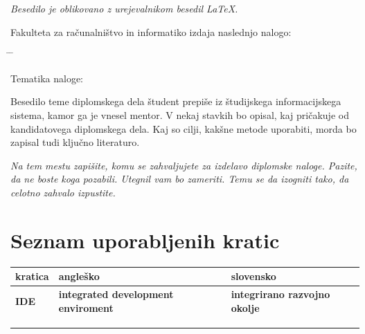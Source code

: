 \documentclass[a4paper, 12pt]{book}
\newcommand{\clearemptydoublepage}{\newpage{\pagestyle{empty}\cleardoublepage}}
\begin{document}
\begin{center}
\mbox{}\vfill
\emph{Besedilo je oblikovano z urejevalnikom besedil \LaTeX.}
\end{center}
\clearemptydoublepage

\thispagestyle{empty}
\vspace*{4cm}

\noindent
Fakulteta za računalništvo in informatiko izdaja naslednjo nalogo:
\medskip
\begin{tabbing}
\hspace{32mm}\= \hspace{6cm} \= \kill

Tematika naloge:
\end{tabbing}
Besedilo teme diplomskega dela študent prepiše iz študijskega informacijskega sistema, kamor ga je vnesel mentor. V nekaj stavkih bo opisal, kaj pričakuje od kandidatovega diplomskega dela. Kaj so cilji, kakšne metode uporabiti, morda bo zapisal tudi ključno literaturo.
\vspace{15mm}

\vspace{2cm}

\clearemptydoublepage

\thispagestyle{empty}\mbox{}\vfill\null\it%
\noindent
Na tem mestu zapišite, komu se zahvaljujete za izdelavo diplomske naloge. Pazite, da ne boste koga pozabili. Utegnil vam bo zameriti. Temu se da izogniti tako, da celotno zahvalo izpustite.
\rm\normalfont

\clearemptydoublepage

\pagestyle{empty}
\def\thepage{}%
\tableofcontents{}

\clearemptydoublepage


\chapter*{Seznam uporabljenih kratic}  %

\noindent\begin{tabular}{p{}|p{}|p{}}    %
  {\bf kratica} & {\bf angleško} & {\bf slovensko} \\ \hline
  {\bf IDE} & {\bf integrated development enviroment} & {\bf integrirano razvojno okolje} \\ \hline
  {\bf } & \\
  {\bf } & \\
  {\bf } & \\
\end{tabular}
\end{document}
